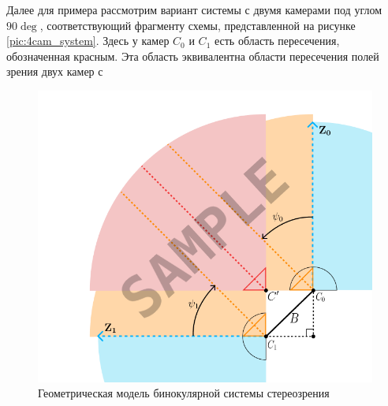  Далее для примера рассмотрим вариант системы с двумя камерами под углом $90\deg$, соответствующий фрагменту схемы,     %
  представленной на рисунке \ref{pic:4cam_system}. Здесь у камер $C_0$ и $C_1$ есть область пересечения, обозначенная красным.
Эта область эквивалентна области пересечения полей зрения двух камер с    
\begin{figure}[H]
    \begin{center}
        \includegraphics[scale=0.5]{pics/sample_simple2cam.png}                                                          %
        \caption{Геометрическая модель бинокулярной системы стереозрения}
        \label{pic:2cam_scheme}
    \end{center}
\end{figure} 

